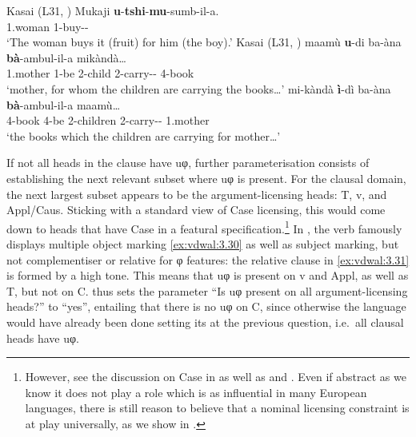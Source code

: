 \documentclass[output=paper]{langsci/langscibook}
\begin{document}
\ea\label{ex:vdwal:3.28}  Kasai (L31, \citealt[87]{Cocchi2000})\label{bkm:Ref345186241}
    \sn
    \gll Mukaji  \textbf{u}{}-\textbf{tshi}{}-\textbf{mu}{}-sumb-il-a.\\
          1.woman  1\Om{}-buy-\Appl{}{}-\Fv{}\\
    \glt      `The woman buys it (fruit) for him (the boy).’
\ex\label{ex:vdwal:3.29}  Kasai (L31, \citealt[104]{deKindBostoen2012}) \label{bkm:Ref345186270}
	\ea
	\gll	 maamù  \textbf{u}{}-di  ba-àna  \textbf{bà}{}-ambul-il-a  mikàndà…\\
	    1.mother  1\Rm{}-be  2-child  2\Sm{}-carry-\Appl{}{}-\Fv{}  4-book\\
	\glt    ‘mother, for whom the children are carrying the books…’
	\ex
	\gll	 mi-kàndà  \textbf{ì}{}-dì  ba-àna  \textbf{bà}{}-ambul-il-a  maamù…\\
	    4-book  4\Rm{}-be  2-children  2\Sm{}-carry-\Appl{}{}-\Fv{}  1.mother\\
	\glt    ‘the books which the children are carrying for mother…’
	\z
\z

If not all heads in the clause have uφ, further parameterisation consists of
establishing the next relevant subset where uφ is present. For the 
clausal domain, the next largest subset appears to be the argument-licensing
heads: T, v, and Appl/Caus. Sticking with a standard view of Case
licensing,
this would come down to heads that have
Case in a featural specification.\footnote{However, see the discussion on Case in 
    as well as \citet{Diercks2012} and
    \Textcite{vanderWal2015}. Even if abstract  as we know it does
not play a role which is as influential in many European languages, there is
still reason to believe that a nominal licensing constraint is at play
universally, as we show in \textcite{SheevanderWal2016,SheevanderWal2018}.} In
, the verb famously displays multiple object marking
\eqref{ex:vdwal:3.30} as well as subject marking, but not complementiser or
relative  for φ features: the relative clause in
\eqref{ex:vdwal:3.31} is formed by a high tone. This means that uφ is
present on v and Appl, as well as T, but not on C.   thus sets
the parameter \enquote{Is uφ present on all argument-licensing heads?} to
\enquote{yes}, entailing that there is no uφ on C, since otherwise the language
would have already been done setting its  at the previous
question, i.e.\ all clausal heads have uφ.
\end{document}
